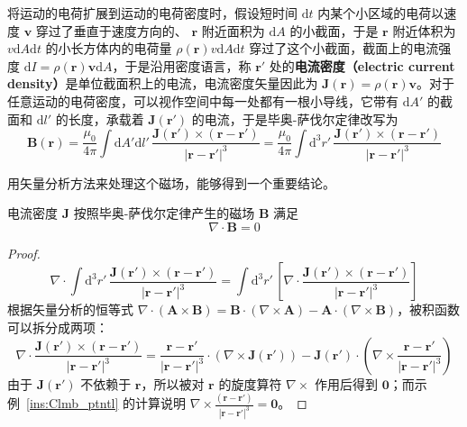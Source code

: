 \documentclass[cn,10pt,math=newtx,citestyle=gb7714-2015,bibstyle=gb7714-2015]{elegantbook}
\def\bm{\boldsymbol}
\def\d{\mathrm d}
\begin{document}
将运动的电荷扩展到运动的电荷密度时，假设短时间 $\d t$ 内某个小区域的电荷以速度 $\bm v$ 穿过了垂直于速度方向的、 $\bm r$ 附近面积为 $\d A$ 的小截面，于是 $\bm r$ 附近体积为 $v\d A\d t$ 的小长方体内的电荷量 $\rho(\bm r)v\d A\d t$ 穿过了这个小截面，截面上的电流强度 $\d I=\rho(\bm r)\bm v\d A$，于是沿用密度语言，称 $\bm r'$ 处的\textbf{电流密度（electric current density）}是单位截面积上的电流，电流密度矢量因此为 $\bm J(\bm r)=\rho(\bm r)\bm v$。对于任意运动的电荷密度，可以视作空间中每一处都有一根小导线，它带有 $\d A'$ 的截面和 $\d l'$ 的长度，承载着 $\bm J(\bm r')$ 的电流，于是毕奥-萨伐尔定律改写为
\begin{equation*}
    \bm B(\bm r) = \frac{\mu_0}{4\pi}\int\d A'\d l'\,\frac{\bm J(\bm r')\times(\bm r-\bm r')}{|\bm r-\bm r'|^3} = \frac{\mu_0}{4\pi}\int\d^3r'\,\frac{\bm J(\bm r')\times(\bm r-\bm r')}{|\bm r-\bm r'|^3}
\end{equation*}

用矢量分析方法来处理这个磁场，能够得到一个重要结论。

\begin{theorem}[磁场的无源定律]
    电流密度 $\bm J$ 按照毕奥-萨伐尔定律产生的磁场 $\bm B$ 满足
    \begin{equation*}
        \nabla\cdot\bm B=0
    \end{equation*}
\end{theorem}
\begin{proof}
    \begin{equation*}
        \nabla\cdot\int\d^3r'\,\frac{\bm J(\bm r')\times(\bm r-\bm r')}{|\bm r-\bm r'|^3} = \int\d^3r'\,\left[\nabla\cdot\frac{\bm J(\bm r')\times(\bm r-\bm r')}{|\bm r-\bm r'|^3}\right]
    \end{equation*}
    根据矢量分析的恒等式 $\nabla\cdot(\bm A\times\bm B)=\bm B\cdot(\nabla\times\bm A)-\bm A\cdot(\nabla\times\bm B)$，被积函数可以拆分成两项：
    \begin{equation*}
        \nabla\cdot\frac{\bm J(\bm r')\times(\bm r-\bm r')}{|\bm r-\bm r'|^3} = \frac{\bm r-\bm r'}{|\bm r-\bm r'|^3}\cdot(\nabla\times \bm J(\bm r'))-\bm J(\bm r')\cdot\left(\nabla\times\frac{\bm r-\bm r'}{|\bm r-\bm r'|^3}\right)
    \end{equation*}
    由于 $\bm J(\bm r')$ 不依赖于 $\bm r$，所以被对 $\bm r$ 的旋度算符 $\nabla\times$ 作用后得到 $\bm 0$；而示例~\ref{ins:Clmb_ptntl} 的计算说明 $\nabla\times\frac{(\bm r-\bm r')}{|\bm r-\bm r'|^3}=\bm 0$。
\end{proof}
\end{document}
